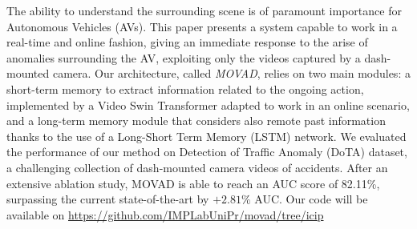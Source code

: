 The ability to understand the surrounding scene is of paramount importance for Autonomous Vehicles (AVs).
This paper presents a system capable to work in a real-time and online fashion, giving an immediate response to the arise of anomalies surrounding the AV, exploiting only the videos captured by a dash-mounted camera.
Our architecture, called \emph{MOVAD}, relies on two main modules: a short-term memory to extract information related to the ongoing action, implemented by a Video Swin Transformer adapted to work in an online scenario, and a long-term memory module that considers also remote past information thanks to the use of a Long-Short Term Memory (LSTM) network.
We evaluated the performance of our method on Detection of Traffic Anomaly (DoTA) dataset, a challenging collection of dash-mounted camera videos of accidents.
After an extensive ablation study, MOVAD is able to reach an AUC score of 82.11\%, surpassing the current state-of-the-art by $+2.81\%$ AUC.
Our code will be available on \url{https://github.com/IMPLabUniPr/movad/tree/icip}